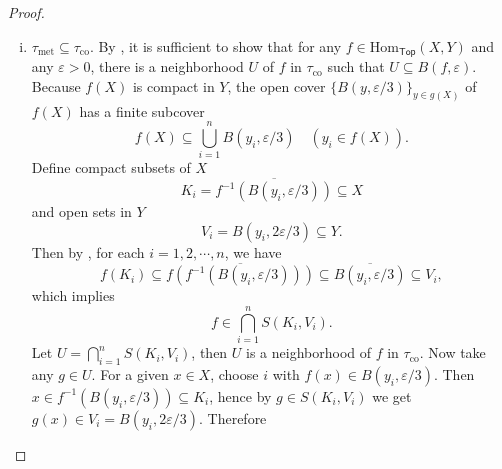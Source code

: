 \documentclass{report}
\newcommand{\midv}{\,\middle\vert\,}
\begin{document}
\begin{proof}
\begin{enumerate}[(i)]
		\[	
		S(K,V)=\left\{f\in \mathrm{Hom}_{\mathsf{Top}}(X,Y)\mid f(K)\subseteq V\right\} \in \tau_{\mathrm{met}}.
		\]
        It is sufficient to show that for any $f\in S(K,V)$, there exists an $\epsilon>0$ such that 
		\[
		B(f,\epsilon):=\left\{ g\in \mathrm{Hom}_{\mathsf{Top}}(X,Y)\midv \sup_{x\in X}d\left(f(x),g(x)\right)<\epsilon \right\} \subseteq S(K,V).
		\]
		Now given any $f\in S(K,V)$, according to , we can define a continuous function on the compact set $f(K)$
		\begin{align*}
			\phi: f(K) &\longrightarrow \mathbb{R}_{\ge 0} \\
			y&\longmapsto d(y, Y-V)
		\end{align*}
		By , since $(Y-V)$ is closed, we have $\phi(y)=0\iff y\in Y-V$. Note $f(K)\cap(Y-V)=\varnothing$. There must be $\phi(y)>0$ for any $y\in f(K)$. Thus, $\phi$ has a positive minimum
	    \[
		 \rho:= \min_{y\in f(K)}\phi(y)>0.
		\]
		Let $\epsilon=\frac{\rho}{2}$. For any $g\in B(f,\epsilon)$ and any $x\in K$, we have
		\begin{align*}
			d(g(x),Y-V) \ge d(f(x), Y-V) -d(g(x),f(x))=\phi(f(x)) -d(g(x),f(x))\ge \rho - \epsilon = \frac{\rho}{2}>0.
		\end{align*}
		This implies $g(x)\notin Y-V$, i.e. $g(x)\in V$. Therefore, we conclude that $g(K)\subseteq V$ and $g\in S(K,V)$. Hence, we have $B(f,\epsilon)\subseteq S(K,V)$, proving $\tau_{\mathrm{co}}\subseteq \tau_{\mathrm{met}}$.
		\item $\tau_{\mathrm{met}}\subseteq \tau_{\mathrm{co}}$. By , it is sufficient to show that for any $f\in \mathrm{Hom}_{\mathsf{Top}}(X,Y)$ and any $\varepsilon>0$, there is a neighborhood $U$ of $f$ in $\tau_{\mathrm{co}}$ such that $U \subseteq B(f,\varepsilon)$. Because $f(X)$ is compact in $Y$, the open cover $\{B(y, \varepsilon / 3)\}_{y \in g(X)}$ of $f(X)$ has a finite subcover
		$$
		f(X) \subseteq \bigcup_{i=1}^n B\left(y_i, \varepsilon / 3\right) \quad\left(y_i \in f(X)\right).
		$$
		Define compact subsets of $X$
		$$
		K_i=\overline{f^{-1}\left(B\left(y_i, \varepsilon / 3\right)\right)} \subseteq X
		$$
		and open sets in $Y$
		$$
		V_i=B\left(y_i, 2 \varepsilon / 3\right) \subseteq Y.
		$$
		Then by , for each $i=1,2,\cdots,n$, we have
		\[
		f\left(K_i\right) \subseteq \overline{f\left(f^{-1}\left(B\left(y_i, \varepsilon / 3\right)\right)\right)} \subseteq\overline{B\left(y_i, \varepsilon / 3\right)} \subseteq V_i,
		\] 
		which implies
		\[
		f \in \bigcap_{i=1}^n S(K_i, V_i).
		\]
		Let $U=\bigcap_{i=1}^n S(K_i, V_i)$, then $U$ is a neighborhood of $f$ in $\tau_{\mathrm{co}}$. Now take any $g \in U$. For a given $x \in X$, choose $i$ with $f(x) \in B\left(y_i, \varepsilon / 3\right)$. Then $x \in f^{-1}\left(B\left(y_i, \varepsilon / 3\right)\right) \subseteq K_i$, hence by $g\in S(K_i,V_i)$ we get $g(x) \in V_i=B\left(y_i, 2 \varepsilon / 3\right)$. Therefore


\end{enumerate}
\end{proof}
\end{document}
